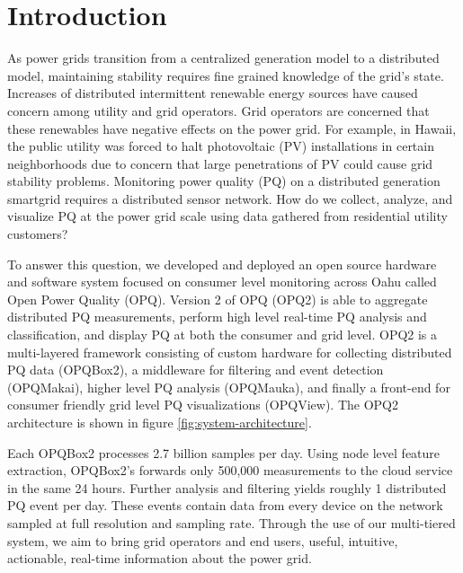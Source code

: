\documentclass[a4paper, conference]{IEEEtran}
\begin{document}
\section{Introduction}
As power grids transition from a centralized generation model to a distributed model, maintaining stability requires fine grained knowledge of the grid's state\cite{ECPAB}. Increases of distributed intermittent renewable energy sources have caused concern among utility and grid operators. Grid operators are concerned that these renewables have negative effects on the power grid. For example, in Hawaii, the public utility was forced to halt photovoltaic (PV) installations in certain neighborhoods due to concern that large penetrations of PV could cause grid stability problems\cite{fares_2015}\cite{mulkern_2013}. Monitoring power quality (PQ) on a distributed generation smartgrid requires a distributed sensor network. How do we collect, analyze, and visualize PQ at the power grid scale using data gathered from residential utility customers? 

To answer this question, we developed and deployed an open source hardware and software system focused on consumer level monitoring across Oahu called Open Power Quality (OPQ). Version 2 of OPQ (OPQ2) is able to aggregate distributed PQ measurements, perform high level real-time PQ analysis and classification, and display PQ at both the consumer and grid level. OPQ2 is a multi-layered framework consisting of custom hardware for collecting distributed PQ data (OPQBox2), a middleware for filtering and event detection (OPQMakai), higher level PQ analysis (OPQMauka), and finally a front-end for consumer friendly grid level PQ visualizations (OPQView). The OPQ2 architecture is shown in figure \ref{fig:system-architecture}.

Each OPQBox2 processes 2.7 billion samples per day. Using node level feature extraction, OPQBox2's forwards only 500,000 measurements to the cloud service in the same 24 hours. Further analysis and filtering yields roughly 1 distributed PQ event per day. These events contain data from every device on the network sampled at full resolution and sampling rate.  Through the use of our multi-tiered system, we aim to bring grid operators and end users, useful, intuitive, actionable, real-time information about the power grid.

\end{document}
